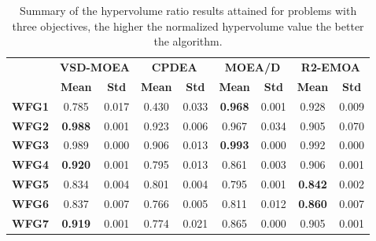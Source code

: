 \begin{table*}[t]
\caption{Summary of the hypervolume ratio results attained for problems with three objectives, the higher the normalized hypervolume value the better the algorithm.}
\label{tab:StatisticsHV_3obj}
\begin{tabular}{cc|c|c|c|c|c|c|c}
\cline{2-9}
\textbf{}                           & \multicolumn{2}{c|}{\textbf{VSD-MOEA}} & \multicolumn{2}{c|}{\textbf{CPDEA}} & \multicolumn{2}{c|}{\textbf{MOEA/D}} & \multicolumn{2}{c}{\textbf{R2-EMOA}} \\ \cline{2-9} 
\textbf{}                           & \textbf{Mean}       & \textbf{Std}     & \textbf{Mean}     & \textbf{Std}    & \textbf{Mean}      & \textbf{Std}    & \textbf{Mean}      & \textbf{Std}     \\ \hline
\multicolumn{1}{c|}{\textbf{WFG1}}  & 0.785               & 0.017            & 0.430             & 0.033           & \textbf{0.968}     & 0.001           & 0.928              & 0.009            \\ \hline
\multicolumn{1}{c|}{\textbf{WFG2}}  & \textbf{0.988}      & 0.001            & 0.923             & 0.006           & 0.967              & 0.034           & 0.905              & 0.070            \\ \hline
\multicolumn{1}{c|}{\textbf{WFG3}}  & 0.989               & 0.000            & 0.906             & 0.013           & \textbf{0.993}     & 0.000           & 0.992              & 0.000            \\ \hline
\multicolumn{1}{c|}{\textbf{WFG4}}  & \textbf{0.920}      & 0.001            & 0.795             & 0.013           & 0.861              & 0.003           & 0.906              & 0.001            \\ \hline
\multicolumn{1}{c|}{\textbf{WFG5}}  & 0.834               & 0.004            & 0.801             & 0.004           & 0.795              & 0.001           & \textbf{0.842}     & 0.002            \\ \hline
\multicolumn{1}{c|}{\textbf{WFG6}}  & 0.837               & 0.007            & 0.766             & 0.005           & 0.811              & 0.012           & \textbf{0.860}     & 0.007            \\ \hline
\multicolumn{1}{c|}{\textbf{WFG7}}  & \textbf{0.919}      & 0.001            & 0.774             & 0.021           & 0.865              & 0.000           & 0.905              & 0.001            \\ \hline

\end{tabular}
\end{table*}
